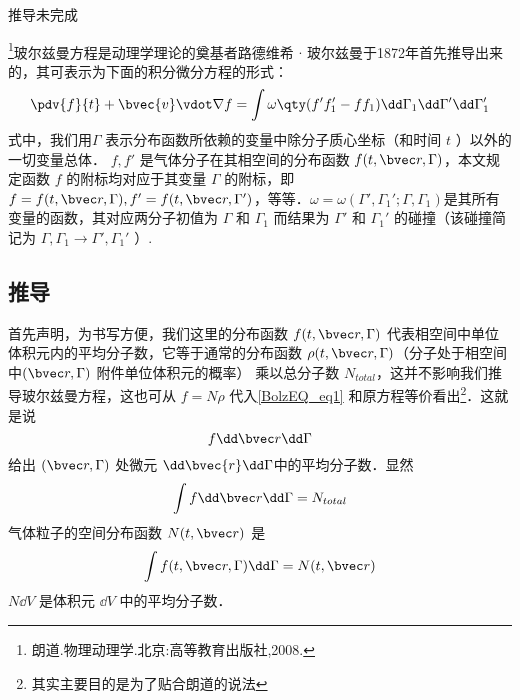 
\begin{issues}

\issueDraft
推导未完成
\end{issues}

\footnote{朗道.物理动理学.北京:高等教育出版社,2008.}玻尔兹曼方程是动理学理论的奠基者路德维希 $\cdot$ 玻尔兹曼于1872年首先推导出来的，其可表示为下面的积分微分方程的形式：
\begin{equation}\label{BolzEQ_eq1}
\pdv{f}{t}+\bvec{v}\vdot\nabla f=\int\omega\qty(f'f_1'-ff_1)\dd\Gamma_1\dd\Gamma'\dd\Gamma_1'
\end{equation}
式中，我们用$\Gamma$ 表示分布函数所依赖的变量中除分子质心坐标（和时间 $t$ ）以外的一切变量总体． $f,f'$ 是气体分子在其相空间的分布函数 $f(t,\bvec r,\Gamma)$，本文规定函数 $f$ 的附标均对应于其变量 $\Gamma$ 的附标，即$f=f(t,\bvec r,\Gamma),f'=f(t,\bvec r,\Gamma')$，等等．$\omega=\omega(\Gamma',\Gamma_1';\Gamma,\Gamma_1)$是其所有变量的函数，其对应两分子初值为 $\Gamma$ 和 $\Gamma_1$ 而结果为 $\Gamma'$ 和 $\Gamma_1'$ 的碰撞（该碰撞简记为 $\Gamma,\Gamma_1\rightarrow\Gamma',\Gamma_1'$ ）. 
\subsection{推导}
首先声明，为书写方便，我们这里的分布函数 $f(t,\bvec r,\Gamma)$ 代表相空间中单位体积元内的平均分子数，它等于通常的分布函数 $\rho(t,\bvec r,\Gamma)$（分子处于相空间中$(\bvec r,\Gamma)$ 附件单位体积元的概率） 乘以总分子数 $N_{total}$，这并不影响我们推导玻尔兹曼方程，这也可从 $f=N\rho$ 代入\autoref{BolzEQ_eq1} 和原方程等价看出\footnote{其实主要目的是为了贴合朗道的说法}．这就是说
\begin{equation}
f\dd \bvec r\dd\Gamma
\end{equation}
给出 $(\bvec r,\Gamma)$ 处微元 $\dd\bvec{r}\dd\Gamma$中的平均分子数．显然
\begin{equation}
\int f\dd \bvec r\dd\Gamma=N_{total}
\end{equation}
气体粒子的空间分布函数 $N(t,\bvec r)$ 是
\begin{equation}
\int f(t,\bvec r,\Gamma)\dd \Gamma=N(t,\bvec r)
\end{equation}
 $N\dd V$ 是体积元 $\dd V$ 中的平均分子数．

